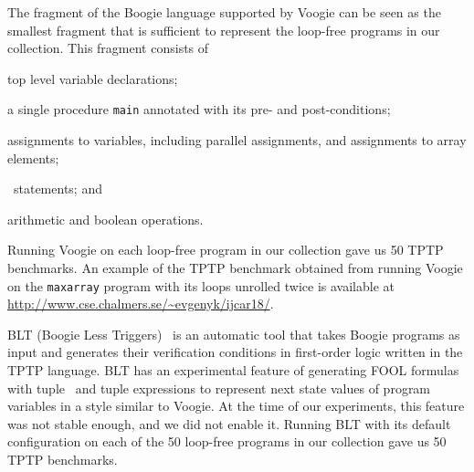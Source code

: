 The fragment of the Boogie language supported by Voogie can be seen as the smallest fragment that is sufficient to represent the loop-free programs in our collection. This fragment consists of
\begin{enumerate*}[label=(\roman*)]
  \item top level variable declarations;
  \item a single procedure \verb'main' annotated with its pre- and post-conditions;
  \item assignments to variables, including parallel assignments, and assignments to array elements;
  \item \ITE\ statements; and
  \item arithmetic and boolean operations.
\end{enumerate*}
Running Voogie on each loop-free program in our collection gave us 50 TPTP benchmarks.
An example of the TPTP benchmark obtained from running Voogie on the \texttt{maxarray} program with its loops unrolled twice is available at \url{http://www.cse.chalmers.se/~evgenyk/ijcar18/}.

BLT (Boogie Less Triggers)~\cite{CF-iFM17} is an automatic tool that takes Boogie programs as input and generates their verification conditions in first-order logic written in the TPTP language. BLT has an experimental feature of generating FOOL formulas with tuple \LETIN\ and tuple expressions to represent next state values of program variables in a style similar to Voogie. At the time of our experiments, this feature was not stable enough, and we did not enable it. Running BLT with its default configuration on each of the 50 loop-free programs in our collection gave us 50 TPTP benchmarks.

